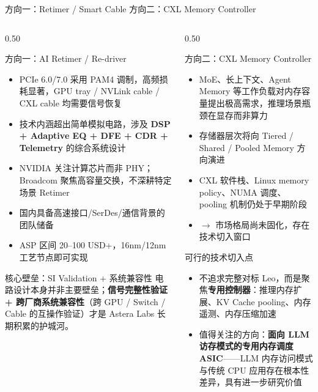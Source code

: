 \documentclass[aspectratio=169, 8pt, UTF8]{ctexbeamer}
\begin{document}
\begin{frame}{方向一：Retimer / Smart Cable \quad 方向二：CXL Memory Controller}
  \begin{columns}[T]
    \begin{column}{0.50\textwidth}
      \begin{block}{方向一：AI Retimer / Re-driver}
        \begin{itemize}
          \item PCIe 6.0/7.0 采用 PAM4 调制，高频损耗显著，GPU tray / NVLink cable / CXL cable 均需要信号恢复
          \item 技术内涵超出简单模拟电路，涉及 \textbf{DSP + Adaptive EQ + DFE + CDR + Telemetry} 的综合系统设计
          \item NVIDIA 关注计算芯片而非 PHY；Broadcom 聚焦高容量交换，不深耕特定场景 Retimer
          \item 国内具备高速接口/SerDes/通信背景的团队储备
          \item ASP 区间 20--100 USD+，16nm/12nm 工艺节点即可实现
        \end{itemize}
      \end{block}
      \begin{alertblock}{核心壁垒：SI Validation + 系统兼容性}
        电路设计本身并非主要壁垒；\textbf{信号完整性验证 + 跨厂商系统兼容性}（跨 GPU / Switch / Cable 的互操作验证）才是 Astera Labs 长期积累的护城河。
      \end{alertblock}
    \end{column}
    \begin{column}{0.50\textwidth}
      \begin{block}{方向二：CXL Memory Controller}
        \begin{itemize}
          \item MoE、长上下文、Agent Memory 等工作负载对内存容量提出极高需求，推理场景瓶颈在显存而非算力
          \item 存储器层次将向 Tiered / Shared / Pooled Memory 方向演进
          \item CXL 软件栈、Linux memory policy、NUMA 调度、pooling 机制仍处于早期阶段
          \item $\to$ 市场格局尚未固化，存在技术切入窗口
        \end{itemize}
      \end{block}
      \begin{exampleblock}{可行的技术切入点}
        \begin{itemize}
          \item 不追求完整对标 Leo，而是聚焦\textbf{专用控制器}：推理内存扩展、KV Cache pooling、内存遥测、内存压缩加速
          \item 值得关注的方向：\textbf{面向 LLM 访存模式的专用内存调度 ASIC}——LLM 内存访问模式与传统 CPU 应用存在根本性差异，具有进一步研究价值
        \end{itemize}
      \end{exampleblock}
    \end{column}
  \end{columns}
\end{frame}
\end{document}
